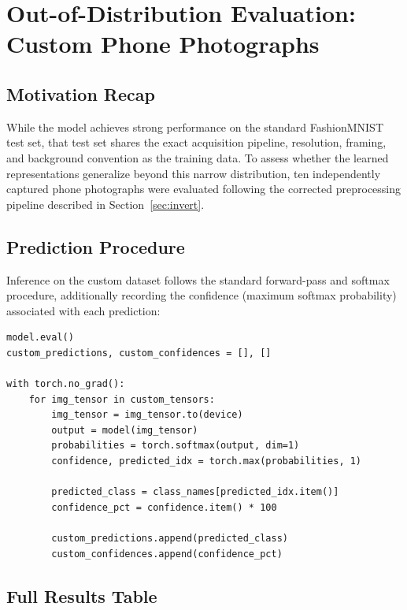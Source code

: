 \documentclass[12pt,a4paper]{report}
\begin{document}
\chapter{Out-of-Distribution Evaluation: Custom Phone Photographs}

\section{Motivation Recap}
While the model achieves strong performance on the standard FashionMNIST test set, that test set shares the exact acquisition pipeline, resolution, framing, and background convention as the training data. To assess whether the learned representations generalize beyond this narrow distribution, ten independently captured phone photographs were evaluated following the corrected preprocessing pipeline described in Section~\ref{sec:invert}.

\section{Prediction Procedure}
Inference on the custom dataset follows the standard forward-pass and softmax procedure, additionally recording the confidence (maximum softmax probability) associated with each prediction:

\begin{lstlisting}[caption={Custom image inference with confidence scoring}]
model.eval()
custom_predictions, custom_confidences = [], []

with torch.no_grad():
    for img_tensor in custom_tensors:
        img_tensor = img_tensor.to(device)
        output = model(img_tensor)
        probabilities = torch.softmax(output, dim=1)
        confidence, predicted_idx = torch.max(probabilities, 1)

        predicted_class = class_names[predicted_idx.item()]
        confidence_pct = confidence.item() * 100

        custom_predictions.append(predicted_class)
        custom_confidences.append(confidence_pct)
\end{lstlisting}

\section{Full Results Table}
\end{document}
